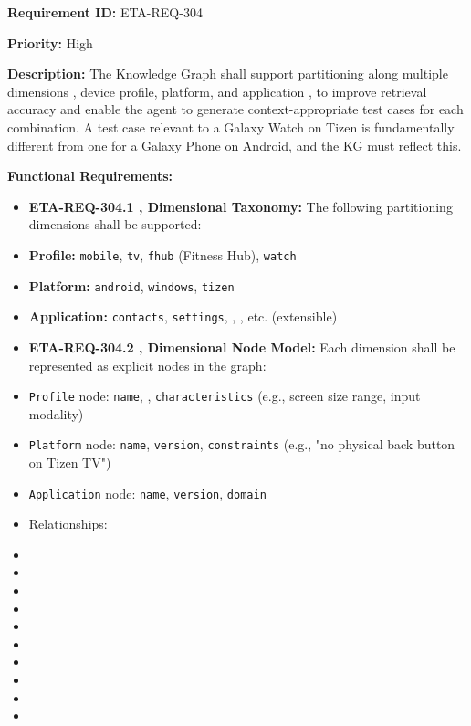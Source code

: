 \textbf{Requirement ID:} ETA-REQ-304

\textbf{Priority:} High

\textbf{Description:}
The Knowledge Graph shall support partitioning along multiple dimensions ,  device profile, platform, and application ,  to improve retrieval accuracy and enable the agent to generate context-appropriate test cases for each combination. A test case relevant to a Galaxy Watch on Tizen is fundamentally different from one for a Galaxy Phone on Android, and the KG must reflect this.

\textbf{Functional Requirements:}

\begin{itemize}[leftmargin=1.4em,itemsep=1pt,topsep=3pt]
  \item \textbf{ETA-REQ-304.1 ,  Dimensional Taxonomy:} The following partitioning dimensions shall be supported:
  \item \textbf{Profile:} \texttt{mobile}, \texttt{tv}, \texttt{fhub} (Fitness Hub), \texttt{watch}
  \item \textbf{Platform:} \texttt{android}, \texttt{windows}, \texttt{tizen}
  \item \textbf{Application:} \texttt{contacts}, \texttt{settings}, , , etc. (extensible)
\end{itemize}

\begin{itemize}[leftmargin=1.4em,itemsep=1pt,topsep=3pt]
  \item \textbf{ETA-REQ-304.2 ,  Dimensional Node Model:} Each dimension shall be represented as explicit nodes in the graph:
  \item \texttt{Profile} node: \texttt{name}, , \texttt{characteristics} (e.g., screen size range, input modality)
  \item \texttt{Platform} node: \texttt{name}, \texttt{version}, \texttt{constraints} (e.g., "no physical back button on Tizen TV")
  \item \texttt{Application} node: \texttt{name}, \texttt{version}, \texttt{domain}
  \item Relationships:
  \item {}
  \item {}
  \item {}
  \item {}
  \item {}
  \item {}
  \item {}
  \item {}
  \item {}
  \item {}
\end{itemize}

